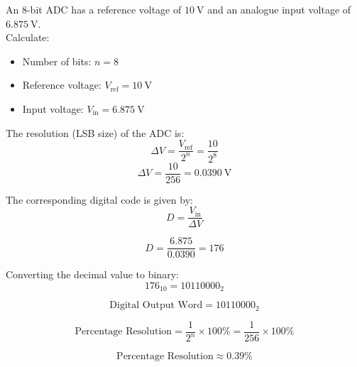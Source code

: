 

An 8-bit ADC has a reference voltage of $10 \ \text{V}$ and an analogue input voltage of
$6.875 \ \text{V}$.\\

Calculate:


\begin{solutionblock}

\begin{itemize}
    \item Number of bits: $n = 8$
    \item Reference voltage: $V_{\text{ref}} = 10 \ \text{V}$
    \item Input voltage: $V_{\text{in}} = 6.875 \ \text{V}$
\end{itemize}

The resolution (LSB size) of the ADC is:
\[
\Delta V = \frac{V_{\text{ref}}}{2^n} = \frac{10}{2^8}
\]
\[
\Delta V = \frac{10}{256} = 0.0390 \ \text{V}
\]

The corresponding digital code is given by:
\[
D = \frac{V_{\text{in}}}{\Delta V}
\]

\[
D = \frac{6.875}{0.0390} = 176
\]

Converting the decimal value to binary:
\[
176_{10} = 10110000_2
\]

\[
\boxed{\text{Digital Output Word} = 10110000_2}
\]

\end{solutionblock}


\begin{solutionblock}

\[
\text{Percentage Resolution} = \frac{1}{2^n} \times 100\% = \frac{1}{256} \times 100\%
\]

\[
\boxed{\text{Percentage Resolution} \approx 0.39\%}
\]

\end{solutionblock}



